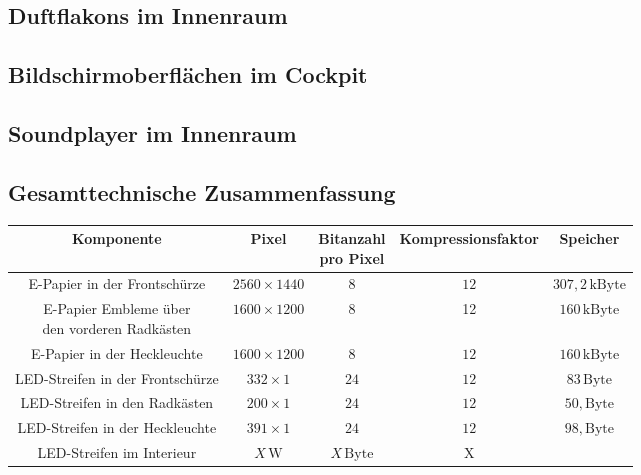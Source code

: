 \subsection{Duftflakons im Innenraum}
\subsection{Bildschirmoberflächen im Cockpit}
\subsection{Soundplayer im Innenraum}
\subsection{Gesamttechnische Zusammenfassung}
\begin{table}[hbt]	
	\centering
	\renewcommand{\arraystretch}{1.5}	%
	\label{tab:Werte}
	\begin{tabular}{c|cccc}
		\textbf{Komponente} & \parbox[t]{0.16\linewidth}{\centering Pixel} & \parbox[t]{0.16\linewidth}{\centering Bitanzahl \\pro Pixel} & \parbox[t]{0.16\linewidth}{\centering Kompressionsfaktor} & \parbox[t]{0.16\linewidth}{\centering Speicher} \\ 
		\hline 
		\hline 
		\parbox[t]{0.4\linewidth}{\centering E-Papier in der Frontschürze} & $ 2560 \times 1440 $ & $ 8 $ & $ 12 $ & $ 307,2\,\mathrm{kByte} $\\ \parbox[t]{0.4\linewidth}{\centering E-Papier Embleme über\\den vorderen Radkästen} & $ 1600 \times 1200 $ & $ 8 $ & 12 & $ 160\,\mathrm{kByte} $ \\
		\parbox[t]{0.4\linewidth}{\centering E-Papier in der Heckleuchte} & $ 1600 \times 1200 $ & $ 8 $ & $ 12 $ & $ 160\,\mathrm{kByte} $ \\
		\parbox[t]{0.4\linewidth}{\centering LED-Streifen in der Frontschürze} & $ 332 \times 1 $ & $ 24 $ & $ 12 $ & $ 83\,\mathrm{Byte} $ \\
		\parbox[t]{0.4\linewidth}{\centering LED-Streifen in den Radkästen} & $ 200 \times 1 $ & $ 24 $ & $ 12 $ & $ 50,\mathrm{Byte} $\\ \parbox[t]{0.4\linewidth}{\centering LED-Streifen in der Heckleuchte} & $ 391 \times 1 $ & $ 24 $ & $ 12 $ & $ 98,\mathrm{Byte} $ \\ 
		\parbox[t]{0.4\linewidth}{\centering LED-Streifen im Interieur} & $ X\,\mathrm{W} $ & $ X\,\mathrm{Byte} $ & X \\

\end{tabular}
\end{table}

